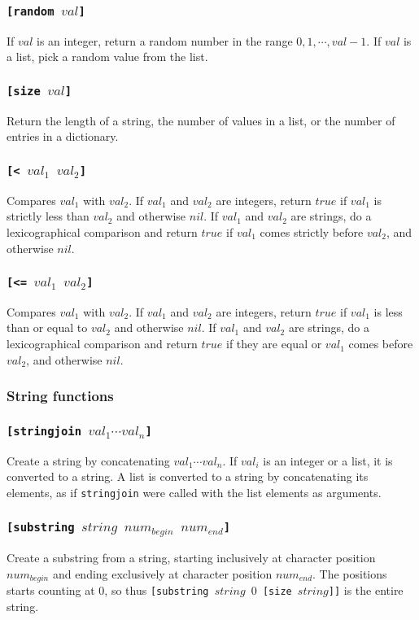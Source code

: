 \documentclass[11pt]{report}
\begin{document}
\subsubsection*{\tt{[random }$val$\tt{]}}
If $val$ is an integer, return a random number in the range $0,1, \cdots, val -1$. If $val$ is a list, pick a random value from the list.
\subsubsection*{\tt{[size }$val$\tt{]}}
Return the length of a string, the number of values in a list, or the number of entries in a dictionary.
\subsubsection*{\tt{[< }$val_1$ $val_2$\tt{]}}
Compares $val_1$ with $val_2$. If $val_1$ and $val_2$ are integers, return $true$ if $val_1$ is strictly less than $val_2$ and otherwise $nil$.
If $val_1$ and $val_2$ are strings, do a lexicographical comparison and return $true$ if $val_1$ comes strictly before $val_2$, and otherwise $nil$.
\subsubsection*{\tt{[<= }$val_1$ $val_2$\tt{]}}
Compares $val_1$ with $val_2$. If $val_1$ and $val_2$ are integers, return $true$ if $val_1$ is less than or equal to $val_2$ and otherwise $nil$.
If $val_1$ and $val_2$ are strings, do a lexicographical comparison and return $true$ if they are equal or $val_1$ comes before $val_2$, and otherwise $nil$.

\subsubsection{String functions}
\subsubsection*{\tt{[stringjoin }$val_1\cdots val_n$\tt{]}}
Create a string by concatenating $val_1\cdots val_n$.
If $val_i$ is an integer or a list, it is converted to a string.
A list is converted to a string by concatenating its elements, as if {\tt stringjoin} were called with the list elements as arguments.

\subsubsection*{\tt{[substring }$string$ $num_{begin}$ $num_{end}$\tt{]}}
Create a substring from a string, starting inclusively at character position $num_{begin}$ and ending exclusively at character position $num_{end}$. The positions starts counting at $0$, so thus {\tt{[substring }$string$ $0$ \tt{[size }$string$\tt{]]}} is the entire string.
\end{document}
